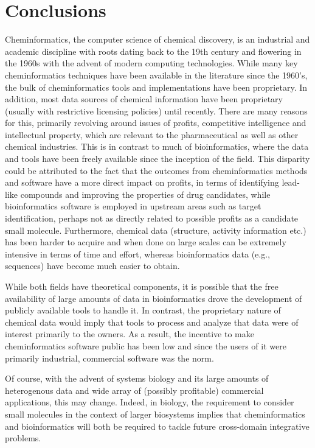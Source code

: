 \documentclass{../sig-alternate}
\begin{document}
%
\section{Conclusions}
\label{sec:conclusions}
Cheminformatics, the computer science of chemical discovery, is an
industrial and academic discipline with roots dating back to the 19th
century and flowering in the 1960s with the advent of modern computing
technologies. While many key cheminformatics techniques have been
available in the literature since the 1960's, the bulk of
cheminformatics tools and implementations have been proprietary. In
addition, most data sources of chemical information have been
proprietary (usually with restrictive licensing policies) until
recently. There are many reasons for this, primarily revolving around
issues of profits, competitive intelligence and intellectual property,
which are relevant to the pharmaceutical as well as other chemical
industries. This is in contrast to much of bioinformatics, where the
data and tools have been freely available since the inception of the
field. This disparity could be attributed to the fact that the
outcomes from cheminformatics methods and software have a more direct
impact on profits, in terms of identifying lead-like compounds and
improving the properties of drug candidates, while bioinformatics
software is employed in upstream areas such as target identification,
perhaps not as directly related to possible profits as a candidate small
molecule. Furthermore, chemical data (structure, activity information
etc.) has been harder to acquire and when done on large scales can be
extremely intensive in terms of time and effort, whereas
bioinformatics data (e.g., sequences) have become much easier to obtain.

While both fields have theoretical components, it is possible that the
free availability of large amounts of data in bioinformatics drove the
development of publicly available tools to handle it. In contrast, the
proprietary nature of chemical data would imply that tools to process
and analyze that data were of interest primarily to the owners. As a
result, the incentive to make cheminformatics software public has been
low and since the users of it were primarily industrial, commercial
software was the norm.

Of course, with the advent of systems biology and its large amounts of
heterogenous data and wide array of (possibly profitable) commercial
applications, this may change. Indeed, in biology, the
requirement to consider small molecules in the context of larger
biosystems implies that cheminformatics and bioinformatics will both
be required to tackle future cross-domain integrative problems.
\end{document}
